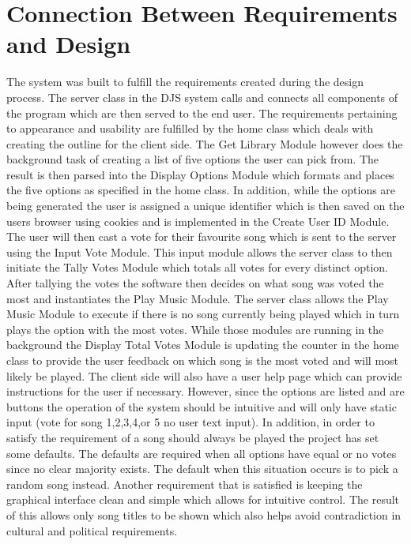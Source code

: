 \documentclass[12pt, titlepage]{article}
\begin{document}
\section{Connection Between Requirements and Design} \label{SecConnection}
The system was built to fulfill the requirements created during the design process. The server class in the DJS system calls and connects all components of the program which are then served to the end user. The requirements pertaining to appearance and usability are fulfilled by the home class which deals with creating the outline for the client side. The Get Library Module however does the background task of creating a list of five options the user can pick from. The result is then parsed into the Display Options Module which formats and places the five options as specified in the home class. In addition, while the options are being generated the user is assigned a unique identifier which is then saved on the users browser using cookies and is implemented in the Create User ID Module. The user will then cast a vote for their favourite song which is sent to the server using the Input Vote Module. This input module allows the server class to then initiate the Tally Votes Module which totals all votes for every distinct option. After tallying the votes the software then decides on what song was voted the most and instantiates the Play Music Module. The server class allows the Play Music Module to execute if there is no song currently being played which in turn plays the option with the most votes. While those modules are running in the background the Display Total Votes Module is updating the counter in the home class to provide the user feedback on which song is the most voted and will most likely be played. The client side will also have a user help page which can provide instructions for the user if necessary. However, since the options are listed and are buttons the operation of the system should be intuitive and will only have static input (vote for song 1,2,3,4,or 5 no user text input). In addition, in order to satisfy the requirement of a song should always be played the project has set some defaults. The defaults are required when all options have equal or no votes since no clear majority exists. The default when this situation occurs is to pick a random song instead. Another requirement that is satisfied is keeping the graphical interface clean and simple which allows for intuitive control. The result of this allows only song titles to be shown which also helps avoid contradiction in cultural and political requirements.
\end{document}
